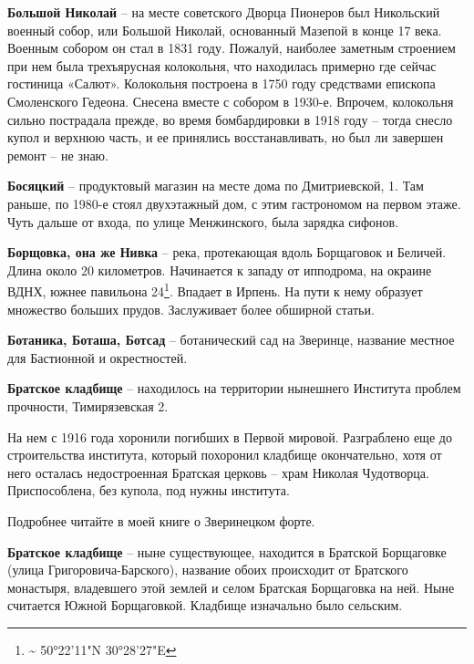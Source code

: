 \medskip

\textbf{Большой Николай} – на месте советского Дворца Пионеров был Никольский военный собор, или Большой Николай, основанный Мазепой в конце 17 века. Военным собором он стал в 1831 году. Пожалуй, наиболее заметным строением при нем была трехъярусная колокольня, что находилась примерно где сейчас гостиница «Салют». Колокольня построена в 1750 году средствами епископа Смоленского Гедеона. Снесена вместе с собором в 1930-е. Впрочем, колокольня сильно пострадала прежде, во время бомбардировки в 1918 году – тогда снесло купол и верхнюю часть, и ее принялись восстанавливать, но был ли завершен ремонт – не знаю.\\

\medskip

\textbf{Босяцкий} – продуктовый магазин на месте дома по Дмитриевской, 1. Там раньше, по 1980-е стоял двухэтажный дом, с этим гастрономом на первом этаже. Чуть дальше от входа, по улице Менжинского, была зарядка сифонов.\\

\medskip

\textbf{Борщовка, она же Нивка} – река, протекающая вдоль Борщаговок и Беличей. Длина около 20 километров. Начинается к западу от ипподрома, на окраине ВДНХ, южнее павильона 24\footnote{\textasciitilde{} 50°22'11"N 30°28'27"E}. Впадает в Ирпень. На пути к нему образует множество больших прудов. Заслуживает более обширной статьи.\\

\medskip

\textbf{Ботаника, Боташа, Ботсад} – ботанический сад на Зверинце, название местное для Бастионной и окрестностей.\\

\medskip


\textbf{Братское кладбище} – находилось на территории нынешнего Института проблем прочности, Тимирязевская 2. 

На нем с 1916 года хоронили погибших в Первой мировой. Разграблено еще до строительства института, который похоронил кладбище окончательно, хотя от него осталась недостроенная Братская церковь – храм Николая Чудотворца. Приспособлена, без купола, под нужны института.

Подробнее читайте в моей книге о Зверинецком форте.\\

\medskip

\textbf{Братское кладбище} – ныне существующее, находится в Братской Борщаговке (улица Григо\-ровича-Барского), название обоих происходит от Братского монастыря, владевшего этой землей и селом Братская Борщаговка на ней. Ныне считается Южной Борщаговкой. Кладбище изначально было сельским.\\

